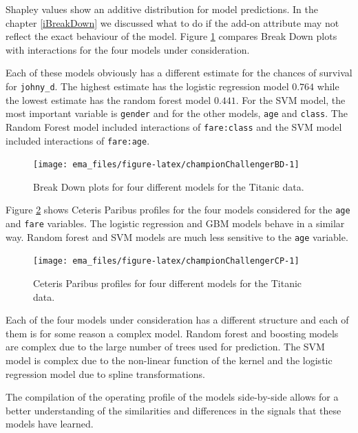 \documentclass[12pt,]{krantz}
\begin{document}
Shapley values show an additive distribution for model predictions. In the chapter \ref{iBreakDown} we discussed what to do if the add-on attribute may not reflect the exact behaviour of the model.
Figure \ref{fig:championChallengerBD} compares Break Down plots with interactions for the four models under consideration.

Each of these models obviously has a different estimate for the chances of survival for \texttt{johny\_d}. The highest estimate has the logistic regression model \(0.764\) while the lowest estimate has the random forest model \(0.441\). For the SVM model, the most important variable is \texttt{gender} and for the other models, \texttt{age} and \texttt{class}. The Random Forest model included interactions of \texttt{fare:class} and the SVM model included interactions of \texttt{fare:age}.

\begin{figure}

{\centering \texttt{[image: ema\_files/figure-latex/championChallengerBD-1]} 

}

\caption{Break Down plots for four different models for the Titanic data.}\label{fig:championChallengerBD}
\end{figure}

Figure \ref{fig:championChallengerCP} shows Ceteris Paribus profiles for the four models considered for the \texttt{age} and \texttt{fare} variables.
The logistic regression and GBM models behave in a similar way. Random forest and SVM models are much less sensitive to the \texttt{age} variable.

\begin{figure}

{\centering \texttt{[image: ema\_files/figure-latex/championChallengerCP-1]} 

}

\caption{Ceteris Paribus profiles for four different models for the Titanic data.}\label{fig:championChallengerCP}
\end{figure}

Each of the four models under consideration has a different structure and each of them is for some reason a complex model. Random forest and boosting models are complex due to the large number of trees used for prediction. The SVM model is complex due to the non-linear function of the kernel and the logistic regression model due to spline transformations.

The compilation of the operating profile of the models side-by-side allows for a better understanding of the similarities and differences in the signals that these models have learned.
\end{document}

